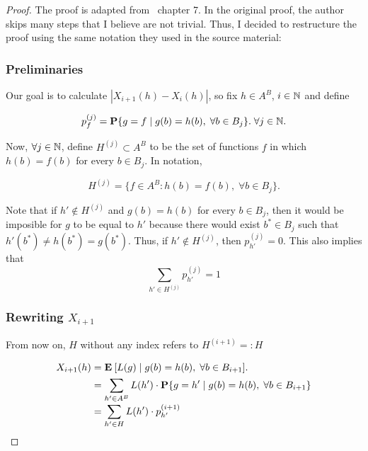 \begin{proof} The proof is adapted from~\cite{alon2016probabilistic} chapter 7. In the original proof, the author skips many steps that I believe are not trivial. Thus, I decided to restructure the proof using the same notation they used in the source material:

\subsubsection*{Preliminaries}
Our goal is to calculate $|X_{i+1}(h) - X_{i}(h)|$, so fix $h \in A^B$, $i\in \mathbb{N}$ and define

\[ p_{f}^{(j)} = \mathbf{P}\{g = f \;|\; g(b) = h(b),\; \forall b \in B_{j}\}.\; \forall j\in \mathbb{N}. \]

Now, $\forall j\in \mathbb{N}$, define $H^{(j)}\subset A^B$ to be the set of functions $f$ in which $h(b) = f(b)$ for every $b \in B_{j}$. In notation,

\[ H^{(j)} = \{f \in A^B: h(b) = f(b),\; \forall b \in B_j\}. \] 

Note that if $h' \not\in H^{(j)}$ and $g(b) = h(b)$ for every $b\in B_{j}$, then it would be imposible for $g$ to be equal to $h'$ because there would exist $b^* \in B_{j}$ such that $h'(b^*) \neq h(b^*) = g(b^*)$. Thus, if $h' \not\in H^{(j)}$, then $p_{h'}^{(j)} = 0$. This also implies that 
\[\sum_{h' \in H^{(j)}} p_{h'}^{(j)} = 1 \] 

\subsubsection*{Rewriting $X_{i+1}$}
From now on, $H$ without any index refers to $H^{(i+1)} =: H$
\[\everymath{\displaystyle}\arraycolsep=1.4pt\def\arraystretch{1.5}
    \begin{array}{rcl}
    X_{i+1}(h) & = & \E[ L(g) \;|\; g(b) = h(b),\; \forall b\in B_{i+1} ]. \\ 
    & = & \sum_{h' \in A^B} L(h') \cdot \P\{g = h' \;|\; g(b) = h(b),\; \forall b \in B_{i+1}\}\\
    & = & \sum_{h' \in H} L(h') \cdot p_{h'}^{(i+1)}
\end{array}\]



\end{proof}
